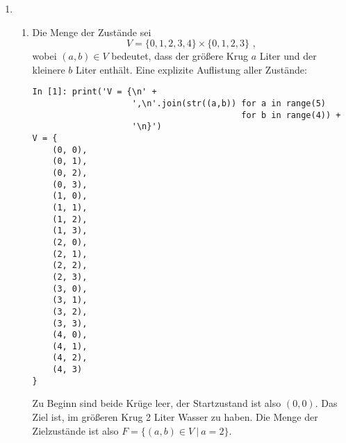 \documentclass[a4paper]{scrartcl}
\begin{document}
\begin{enumerate}
    \item
        \begin{enumerate}[label=(\alph*)]
            \item
                Die Menge der Zustände sei
                \begin{equation*}
                    V = \{0,1,2,3,4\} \times \{0,1,2,3\} \text{ ,}
                \end{equation*}
                wobei $(a,b) \in V$ bedeutet, dass der größere Krug $a$ Liter
                und der kleinere $b$ Liter enthält.
                Eine explizite Auflistung aller Zustände:
                \begin{lstlisting}
In [1]: print('V = {\n' +
                    ',\n'.join(str((a,b)) for a in range(5)
                                          for b in range(4)) +
                    '\n}')
V = {
    (0, 0),
    (0, 1),
    (0, 2),
    (0, 3),
    (1, 0),
    (1, 1),
    (1, 2),
    (1, 3),
    (2, 0),
    (2, 1),
    (2, 2),
    (2, 3),
    (3, 0),
    (3, 1),
    (3, 2),
    (3, 3),
    (4, 0),
    (4, 1),
    (4, 2),
    (4, 3)
}

                \end{lstlisting}

                Zu Beginn sind beide Krüge leer, der Startzustand ist also
                $(0,0)$. Das Ziel ist, im größeren Krug 2 Liter Wasser zu
                haben.  Die Menge der Zielzustände ist also $F = \{(a,b) \in V
                \ |\ a = 2\}$.



\end{enumerate}
\end{enumerate}
\end{document}
